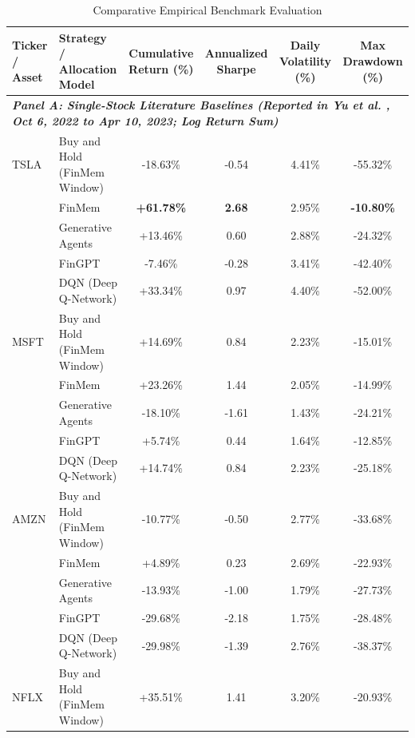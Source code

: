 \documentclass[conference]{IEEEtran}
\begin{document}
\begin{table}[t]
\caption{Comparative Empirical Benchmark Evaluation}
\label{tab:main_results}
\centering
\begin{tabular}{llcccc}
\toprule
\textbf{Ticker / Asset} & \textbf{Strategy / Allocation Model} & \textbf{Cumulative Return (\%)} & \textbf{Annualized Sharpe} & \textbf{Daily Volatility (\%)} & \textbf{Max Drawdown (\%)} \\
\midrule
\multicolumn{6}{l}{\textit{\textbf{Panel A: Single-Stock Literature Baselines (Reported in Yu et al. \cite{yu2023finmem}, Oct 6, 2022 to Apr 10, 2023; Log Return Sum)}}} \\
\midrule
TSLA & Buy and Hold (FinMem Window) & -18.63\% & -0.54 & 4.41\% & -55.32\% \\
     & FinMem \cite{yu2023finmem} & \textbf{+61.78\%} & \textbf{2.68} & 2.95\% & \textbf{-10.80\%} \\
     & Generative Agents \cite{park2023generative} & +13.46\% & 0.60 & 2.88\% & -24.32\% \\
     & FinGPT \cite{yang2023fingpt} & -7.46\% & -0.28 & 3.41\% & -42.40\% \\
     & DQN (Deep Q-Network) \cite{yu2023finmem} & +33.34\% & 0.97 & 4.40\% & -52.00\% \\
\midrule
MSFT & Buy and Hold (FinMem Window) & +14.69\% & 0.84 & 2.23\% & -15.01\% \\
     & FinMem \cite{yu2023finmem} & +23.26\% & 1.44 & 2.05\% & -14.99\% \\
     & Generative Agents \cite{park2023generative} & -18.10\% & -1.61 & 1.43\% & -24.21\% \\
     & FinGPT \cite{yang2023fingpt} & +5.74\% & 0.44 & 1.64\% & -12.85\% \\
     & DQN (Deep Q-Network) \cite{yu2023finmem} & +14.74\% & 0.84 & 2.23\% & -25.18\% \\
\midrule
AMZN & Buy and Hold (FinMem Window) & -10.77\% & -0.50 & 2.77\% & -33.68\% \\
     & FinMem \cite{yu2023finmem} & +4.89\% & 0.23 & 2.69\% & -22.93\% \\
     & Generative Agents \cite{park2023generative} & -13.93\% & -1.00 & 1.79\% & -27.73\% \\
     & FinGPT \cite{yang2023fingpt} & -29.68\% & -2.18 & 1.75\% & -28.48\% \\
     & DQN (Deep Q-Network) \cite{yu2023finmem} & -29.98\% & -1.39 & 2.76\% & -38.37\% \\
\midrule
NFLX & Buy and Hold (FinMem Window) & +35.51\% & 1.41 & 3.20\% & -20.93\% \\

\end{tabular}
\end{table}
\end{document}
